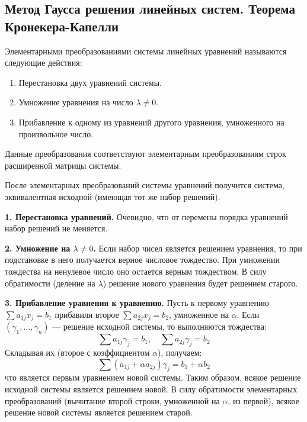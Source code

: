\subsection{Метод Гаусса решения линейных систем. Теорема Кронекера-Капелли}

\begin{definition}
Элементарными преобразованиями системы линейных уравнений называются следующие действия:
\begin{enumerate}
    \item Перестановка двух уравнений системы.
    \item Умножение уравнения на число $\lambda \neq 0$.
    \item Прибавление к одному из уравнений другого уравнения, умноженного на произвольное число.
\end{enumerate}
Данные преобразования соответствуют элементарным преобразованиям строк расширенной матрицы системы.
\end{definition}

\begin{theorem}
После элементарных преобразований системы уравнений получится система, эквивалентная исходной (имеющая тот же набор решений).
\end{theorem}

\begin{tcolorbox}[title=Доказательство, breakable]
\textbf{1. Перестановка уравнений.} Очевидно, что от перемены порядка уравнений набор решений не меняется.

\textbf{2. Умножение на $\lambda \neq 0$.} Если набор чисел является решением уравнения, то при подстановке в него получается верное числовое тождество. При умножении тождества на ненулевое число оно остается верным тождеством. В силу обратимости (деление на $\lambda$) решение нового уравнения будет решением старого.

\textbf{3. Прибавление уравнения к уравнению.} Пусть к первому уравнению $\sum a_{1j}x_j = b_1$ прибавили второе $\sum a_{2j}x_j = b_2$, умноженное на $\alpha$. Если $(\gamma_1, \dots, \gamma_n)$ — решение исходной системы, то выполняются тождества:
\[ \sum a_{1j}\gamma_j = b_1, \quad \sum a_{2j}\gamma_j = b_2 \]
Складывая их (второе с коэффициентом $\alpha$), получаем:
\[ \sum (a_{1j} + \alpha a_{2j})\gamma_j = b_1 + \alpha b_2 \]
что является первым уравнением новой системы. Таким образом, всякое решение исходной системы является решением новой. В силу обратимости элементарных преобразований (вычитание второй строки, умноженной на $\alpha$, из первой), всякое решение новой системы является решением старой.
\end{tcolorbox}

